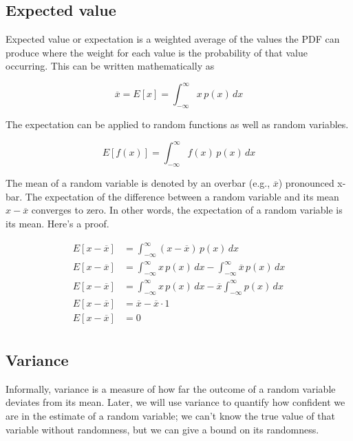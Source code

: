 \subsection{Expected value}

Expected value or expectation is a weighted average of the values the PDF can
produce where the weight for each value is the probability of that value
occurring. This can be written mathematically as

\begin{equation*}
  \overline{x} = E[x] = \int_{-\infty}^\infty x \,p(x) \,dx
\end{equation*}

The expectation can be applied to random functions as well as random variables.

\begin{equation*}
  E[f(x)] = \int_{-\infty}^\infty f(x) \,p(x) \,dx
\end{equation*}

The mean of a random variable is denoted by an overbar (e.g., $\overline{x}$)
pronounced x-bar. The expectation of the difference between a random variable
and its mean $x - \overline{x}$ converges to zero. In other words, the
expectation of a random variable is its mean. Here's a proof.

\begin{align*}
  E[x - \overline{x}] &= \int_{-\infty}^\infty (x - \overline{x}) \,p(x) \,dx \\
  E[x - \overline{x}] &= \int_{-\infty}^\infty x \, p(x) \,dx -
    \int_{-\infty}^\infty \overline{x} \,p(x) \,dx \\
  E[x - \overline{x}] &= \int_{-\infty}^\infty x \,p(x) \,dx -
    \overline{x} \int_{-\infty}^\infty p(x) \,dx \\
  E[x - \overline{x}] &= \overline{x} - \overline{x} \cdot 1 \\
  E[x - \overline{x}] &= 0 \\
\end{align*}

\subsection{Variance}

Informally, variance is a measure of how far the outcome of a random variable
deviates from its mean. Later, we will use variance to quantify how confident we
are in the estimate of a random variable; we can't know the true value of that
variable without randomness, but we can give a bound on its randomness.

